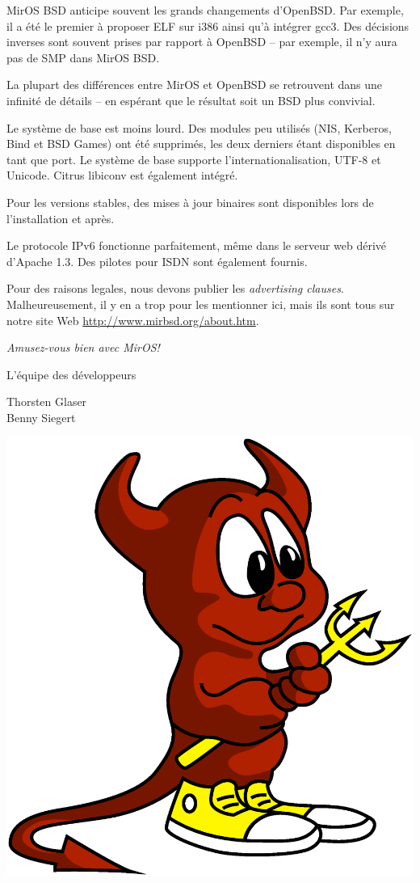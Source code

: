 \documentclass[a4paper,landscape,11pt,notumble]{leaflet}
\begin{document}
MirOS BSD anticipe souvent les grands changements d’OpenBSD. Par exemple, il a été le premier à proposer ELF sur i386 ainsi qu’à intégrer gcc3. Des décisions inverses sont souvent prises par rapport à OpenBSD – par exemple, il n’y aura pas de SMP dans MirOS BSD.

La plupart des différences entre MirOS et OpenBSD se retrouvent dans une infinité de détails – en espérant que le résultat soit un BSD plus convivial.

Le système de base est moins lourd. Des modules peu utilisés (NIS, Kerberos, Bind et BSD Games) ont été supprimés, les deux derniers étant disponibles en tant que port. Le système de base supporte l’internationalisation, UTF-8 et Unicode. Citrus libiconv est également intégré.

Pour les versions stables, des mises à jour binaires sont disponibles lors de l’installation et après.

Le protocole IPv6 fonctionne parfaitement, même dans le serveur web dérivé d’Apache 1.3. Des pilotes pour ISDN sont également fournis.

Pour des raisons legales, nous devons publier les \emph{advertising clauses}. Malheureusement, il y en a trop pour les mentionner ici, mais ils sont tous sur notre site Web
\url{http://www.mirbsd.org/about.htm}.

\newpage


\graybox\par
\begin{center}
\vspace{3ex}
{\Large\itshape
Amusez-vous bien avec MirOS!\par\medskip
L'équipe des développeurs\par\medskip
\color{darkred}%
Thorsten Glaser\\
Benny Siegert\par
}

\vfill

\includegraphics[width=0.75\columnwidth]{img/bsdaemon}

\vfill%
\end{center}%
\end{document}
